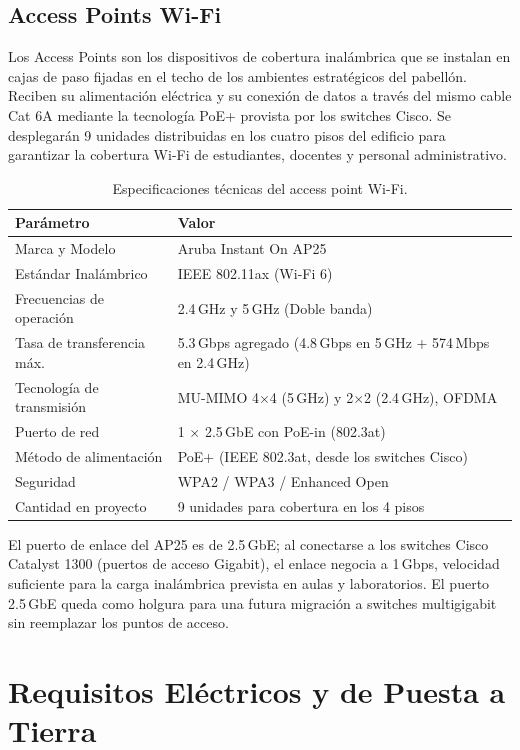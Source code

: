 \subsection{Access Points Wi-Fi}
Los Access Points son los dispositivos de cobertura inalámbrica que se instalan en cajas de paso fijadas en el techo de los ambientes estratégicos del pabellón. Reciben su alimentación eléctrica y su conexión de datos a través del mismo cable Cat 6A mediante la tecnología PoE+ provista por los switches Cisco. Se desplegarán 9 unidades distribuidas en los cuatro pisos del edificio para garantizar la cobertura Wi-Fi de estudiantes, docentes y personal administrativo.

\begin{table}[H]
\centering
\caption{Especificaciones técnicas del access point Wi-Fi.}
\label{tab:spec_ap}
\begin{tabular}{lp{9cm}}
\hline
\textbf{Parámetro} & \textbf{Valor} \\
\hline
Marca y Modelo & Aruba Instant On AP25 \\
Estándar Inalámbrico & IEEE 802.11ax (Wi-Fi 6) \\
Frecuencias de operación & 2.4\,GHz y 5\,GHz (Doble banda) \\
Tasa de transferencia máx. & 5.3\,Gbps agregado (4.8\,Gbps en 5\,GHz + 574\,Mbps en 2.4\,GHz) \\
Tecnología de transmisión & MU-MIMO 4$\times$4 (5\,GHz) y 2$\times$2 (2.4\,GHz), OFDMA \\
Puerto de red & 1 $\times$ 2.5\,GbE con PoE-in (802.3at) \\
Método de alimentación & PoE+ (IEEE 802.3at, desde los switches Cisco) \\
Seguridad & WPA2 / WPA3 / Enhanced Open \\
Cantidad en proyecto & 9 unidades para cobertura en los 4 pisos \\
\hline
\end{tabular}
\end{table}

\noindent El puerto de enlace del AP25 es de 2.5\,GbE; al conectarse a los switches Cisco Catalyst 1300 (puertos de acceso Gigabit), el enlace negocia a 1\,Gbps, velocidad suficiente para la carga inalámbrica prevista en aulas y laboratorios. El puerto 2.5\,GbE queda como holgura para una futura migración a switches multigigabit sin reemplazar los puntos de acceso.

\section{Requisitos Eléctricos y de Puesta a Tierra}

